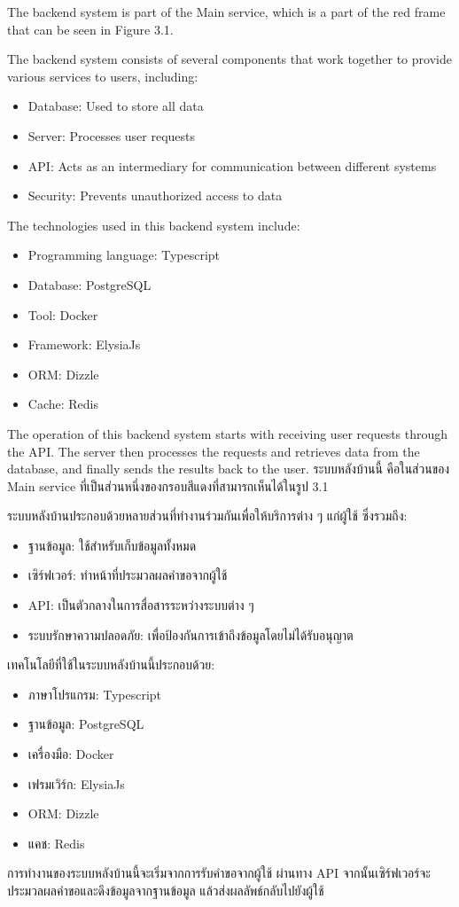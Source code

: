 \ifenglish
The backend system is part of the Main service, which is a part of the red frame that can be seen in Figure 3.1.

The backend system consists of several components that work together to provide various services to users, including:
\begin{itemize}
    \item Database: Used to store all data
    \item Server: Processes user requests
    \item API: Acts as an intermediary for communication between different systems
    \item Security: Prevents unauthorized access to data
\end{itemize}

The technologies used in this backend system include:
\begin{itemize}
    \item Programming language: Typescript
    \item Database: PostgreSQL
    \item Tool: Docker
    \item Framework: ElysiaJs
    \item ORM: Dizzle
    \item Cache: Redis
\end{itemize}

The operation of this backend system starts with receiving user requests through the API. The server then processes the requests and retrieves data from the database, and finally sends the results back to the user.
\else 
ระบบหลังบ้านนี้ คือในส่วนของ Main service ที่เป็นส่วนหนึ่งของกรอบสีแดงที่สามารถเห็นได้ในรูป 3.1 

ระบบหลังบ้านประกอบด้วยหลายส่วนที่ทำงานร่วมกันเพื่อให้บริการต่าง ๆ แก่ผู้ใช้ ซึ่งรวมถึง:
\begin{itemize}
    \item ฐานข้อมูล: ใช้สำหรับเก็บข้อมูลทั้งหมด
    \item เซิร์ฟเวอร์: ทำหน้าที่ประมวลผลคำขอจากผู้ใช้
    \item API: เป็นตัวกลางในการสื่อสารระหว่างระบบต่าง ๆ
    \item ระบบรักษาความปลอดภัย: เพื่อป้องกันการเข้าถึงข้อมูลโดยไม่ได้รับอนุญาต
\end{itemize}

เทคโนโลยีที่ใช้ในระบบหลังบ้านนี้ประกอบด้วย:
\begin{itemize}
    \item ภาษาโปรแกรม: Typescript
    \item ฐานข้อมูล: PostgreSQL
    \item เครื่องมือ: Docker
    \item เฟรมเวิร์ก: ElysiaJs
    \item ORM: Dizzle
    \item แคช: Redis
\end{itemize}

การทำงานของระบบหลังบ้านนี้จะเริ่มจากการรับคำขอจากผู้ใช้ ผ่านทาง API จากนั้นเซิร์ฟเวอร์จะประมวลผลคำขอและดึงข้อมูลจากฐานข้อมูล แล้วส่งผลลัพธ์กลับไปยังผู้ใช้
\fi